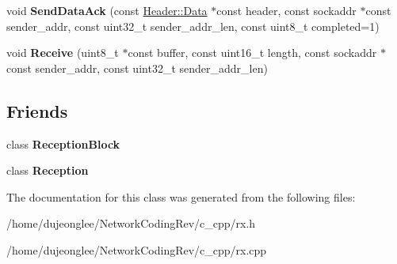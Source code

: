 \begin{DoxyCompactItemize}
\item 
void {\bfseries Send\+Data\+Ack} (const \hyperlink{struct_network_coding_1_1_header_1_1_data}{Header\+::\+Data} $\ast$const header, const sockaddr $\ast$const sender\+\_\+addr, const uint32\+\_\+t sender\+\_\+addr\+\_\+len, const uint8\+\_\+t completed=1)\hypertarget{class_network_coding_1_1_reception_session_a77e5e682b295c7dd449b75530494830e}{}\label{class_network_coding_1_1_reception_session_a77e5e682b295c7dd449b75530494830e}

\item 
void {\bfseries Receive} (uint8\+\_\+t $\ast$const buffer, const uint16\+\_\+t length, const sockaddr $\ast$const sender\+\_\+addr, const uint32\+\_\+t sender\+\_\+addr\+\_\+len)\hypertarget{class_network_coding_1_1_reception_session_a526ea619f4713827cfc481f8b25a44ba}{}\label{class_network_coding_1_1_reception_session_a526ea619f4713827cfc481f8b25a44ba}

\end{DoxyCompactItemize}
\subsection*{Friends}
\begin{DoxyCompactItemize}
\item 
class {\bfseries Reception\+Block}\hypertarget{class_network_coding_1_1_reception_session_a3b0db9f68934c426ad673e63d3183b29}{}\label{class_network_coding_1_1_reception_session_a3b0db9f68934c426ad673e63d3183b29}

\item 
class {\bfseries Reception}\hypertarget{class_network_coding_1_1_reception_session_ab65c4855c6a2c2d0c0b90c5108518547}{}\label{class_network_coding_1_1_reception_session_ab65c4855c6a2c2d0c0b90c5108518547}

\end{DoxyCompactItemize}


The documentation for this class was generated from the following files\+:\begin{DoxyCompactItemize}
\item 
/home/dujeonglee/\+Network\+Coding\+Rev/c\+\_\+cpp/rx.\+h\item 
/home/dujeonglee/\+Network\+Coding\+Rev/c\+\_\+cpp/rx.\+cpp\end{DoxyCompactItemize}
